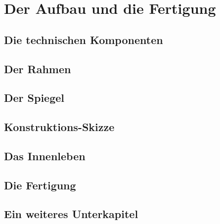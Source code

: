 \chapter{Der Aufbau und die Fertigung}
\label{chapter:kap1}
\section{Die technischen Komponenten}
\section{Der Rahmen}
\section{Der Spiegel}
\section{Konstruktions-Skizze}
\section{Das Innenleben}
\section{Die Fertigung}
\section{Ein weiteres Unterkapitel}
